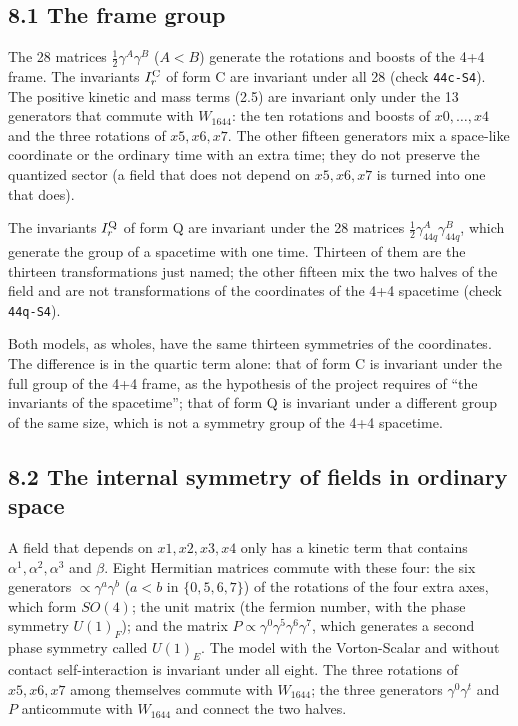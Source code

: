 \documentclass[
  10pt,
]{article}
\begin{document}
\hypertarget{the-frame-group}{%
\subsection{8.1 The frame group}\label{the-frame-group}}

The 28 matrices \(\tfrac12\gamma^A\gamma^B\) (\(A<B\)) generate the
rotations and boosts of the 4+4 frame. The invariants \(I_r^{\rm C}\) of
form C are invariant under all 28 (check \texttt{44c-S4}). The positive
kinetic and mass terms (2.5) are invariant only under the 13 generators
that commute with \(W_{1644}\): the ten rotations and boosts of
\(x0,\dots,x4\) and the three rotations of \(x5,x6,x7\). The other
fifteen generators mix a space-like coordinate or the ordinary time with
an extra time; they do not preserve the quantized sector (a field that
does not depend on \(x5,x6,x7\) is turned into one that does).

The invariants \(I_r^{\rm Q}\) of form Q are invariant under the 28
matrices \(\tfrac12\gamma_{44q}^A\gamma_{44q}^B\), which generate the
group of a spacetime with one time. Thirteen of them are the thirteen
transformations just named; the other fifteen mix the two halves of the
field and are not transformations of the coordinates of the 4+4
spacetime (check \texttt{44q-S4}).

Both models, as wholes, have the same thirteen symmetries of the
coordinates. The difference is in the quartic term alone: that of form C
is invariant under the full group of the 4+4 frame, as the hypothesis of
the project requires of ``the invariants of the spacetime''; that of
form Q is invariant under a different group of the same size, which is
not a symmetry group of the 4+4 spacetime.

\hypertarget{the-internal-symmetry-of-fields-in-ordinary-space}{%
\subsection{8.2 The internal symmetry of fields in ordinary
space}\label{the-internal-symmetry-of-fields-in-ordinary-space}}

A field that depends on \(x1,x2,x3,x4\) only has a kinetic term that
contains \(\alpha^1,\alpha^2,\alpha^3\) and \(\beta\). Eight Hermitian
matrices commute with these four: the six generators
\(\propto\gamma^a\gamma^b\) (\(a<b\) in \(\{0,5,6,7\}\)) of the
rotations of the four extra axes, which form \(SO(4)\); the unit matrix
(the fermion number, with the phase symmetry \(U(1)_F\)); and the matrix
\(P\propto\gamma^0\gamma^5\gamma^6\gamma^7\), which generates a second
phase symmetry called \(U(1)_E\). The model with the Vorton-Scalar and
without contact self-interaction is invariant under all eight. The three
rotations of \(x5,x6,x7\) among themselves commute with \(W_{1644}\);
the three generators \(\gamma^0\gamma^t\) and \(P\) anticommute with
\(W_{1644}\) and connect the two halves.
\end{document}
